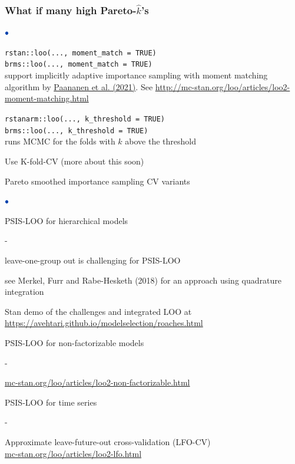 \documentclass[english,t]{beamer}
\newenvironment{list1}{
   \begin{list}{$\color{list1}\bullet$}{\itemsep=6pt}}{
  \end{list}}
\newenvironment{list2}{
  \begin{list}{-}{\baselineskip=12pt\itemsep=2pt}}{
  \end{list}}
\begin{document}
\begin{frame}[fragile]
  \frametitle{What if many high Pareto-$\hat{k}$'s}

  \begin{list1}
  \item<+-> \texttt{rstan::loo(..., moment\_match = TRUE)}\\
    \texttt{brms::loo(..., moment\_match = TRUE)}\\
    support implicitly adaptive importance sampling with moment
    matching algorithm by
    \href{https://doi.org/10.1007/s11222-020-09982-2}{Paananen et al. (2021)}.  See \url{http://mc-stan.org/loo/articles/loo2-moment-matching.html}
  \item<+-> \texttt{rstanarm::loo(..., k\_threshold = TRUE)}\\
    \texttt{brms::loo(..., k\_threshold = TRUE)}\\
    runs MCMC for the folds with $\hat{k}$ above the threshold
  \item<+-> Use K-fold-CV (more about this soon)
  \end{list1}
  
\end{frame}

\begin{frame}{Pareto smoothed importance sampling CV variants}

\begin{list1}
\item PSIS-LOO for hierarchical models
  \begin{list2}
  \item leave-one-group out is challenging for PSIS-LOO\\ \vspace{0.2\baselineskip}
    
  \item {\small see Merkel, Furr and Rabe-Hesketh
      (2018) for an approach using quadrature integration}
  \item Stan demo of the challenges and integrated LOO at \url{https://avehtari.github.io/modelselection/roaches.html}
  \end{list2}
  \item<2-> PSIS-LOO for non-factorizable models
    \begin{list2}
    \item {\url{mc-stan.org/loo/articles/loo2-non-factorizable.html}}
    \end{list2}
  \item<3-> PSIS-LOO for time series
  \begin{list2}
  \item Approximate leave-future-out cross-validation (LFO-CV) \\ \vspace{0.2\baselineskip}
    {\url{mc-stan.org/loo/articles/loo2-lfo.html}}
  \end{list2}
\end{list1}

\end{frame}
\end{document}
